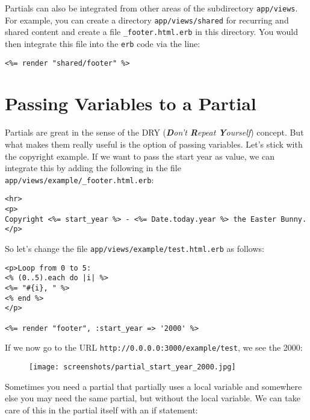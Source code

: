 \documentclass[a4paper]{book}
\begin{document}
Partials can also be integrated from other areas of the subdirectory \texttt{app/views}. For example, you can create a directory \texttt{app/views/shared} for recurring and shared content and create a file \texttt{\_footer.html.erb} in this directory. You would then integrate this file into the \texttt{erb} code via the line:

\begin{shaded}\begin{verbatim}
<%= render "shared/footer" %>
\end{verbatim}\end{shaded}

\section{Passing Variables to a Partial}\label{passing-variables-to-a-partial}

Partials are great in the sense of the DRY (\emph{\textbf{D}on't \textbf{R}epeat \textbf{Y}ourself}) concept. But what makes them really useful is the option of passing variables. Let's stick with the copyright example. If we want to pass the start year as value, we can integrate this by adding the following in the file \texttt{app/views/example/\_footer.html.erb}:

\begin{shaded}\begin{verbatim}
<hr>
<p>
Copyright <%= start_year %> - <%= Date.today.year %> the Easter Bunny.
</p>
\end{verbatim}\end{shaded}

So let's change the file \texttt{app/views/example/test.html.erb} as follows:

\begin{shaded}\begin{verbatim}
<p>Loop from 0 to 5:
<% (0..5).each do |i| %>
<%= "#{i}, " %>
<% end %>
</p>

<%= render "footer", :start_year => '2000' %>
\end{verbatim}\end{shaded}

If we now go to the URL \texttt{http://0.0.0.0:3000/example/test}, we see the 2000:

\begin{figure}[htbp]
\centering
\texttt{[image: screenshots/partial\_start\_year\_2000.jpg]}
\end{figure}

Sometimes you need a partial that partially uses a local variable and somewhere else you may need the same partial, but without the local variable. We can take care of this in the partial itself with an if statement:
\end{document}
